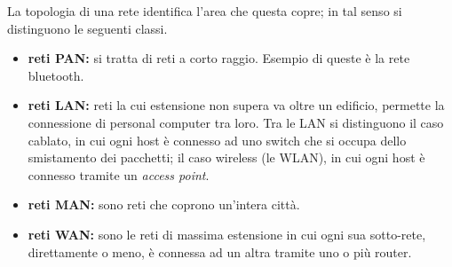 \documentclass{subfiles}
\begin{document}
La topologia di una rete identifica l'area che questa copre; in tal senso si distinguono le seguenti classi.
\begin{itemize}
    \item \textbf{reti PAN:} si tratta di reti a corto raggio. Esempio di queste è la rete bluetooth.

    \item \textbf{reti LAN:} reti la cui estensione non supera va oltre un edificio, permette la connessione di personal computer tra loro.
          Tra le LAN si distinguono il caso cablato, in cui ogni host è connesso ad uno switch che si occupa dello smistamento dei pacchetti;
          il caso wireless (le WLAN), in cui ogni host è connesso tramite un \emph{access point}.

    \item \textbf{reti MAN:} sono reti che coprono un'intera città.

    \item \textbf{reti WAN:} sono le reti di massima estensione in cui ogni sua sotto-rete, direttamente o meno,
          è connessa ad un altra tramite uno o più router.
\end{itemize}
\end{document}

